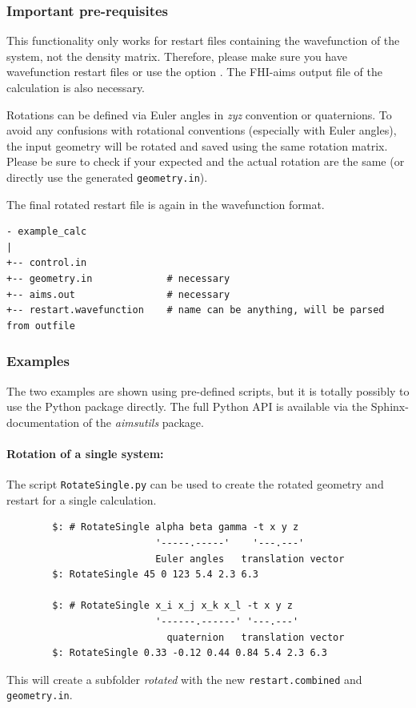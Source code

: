 \subsubsection*{Important pre-requisites}
This functionality only works for restart files containing the wavefunction of
the system, not the density matrix. Therefore, please make sure you have
wavefunction restart files or use the option
. The FHI-aims output file of the
calculation is also necessary.

Rotations can be defined via Euler angles in \emph{zyz} convention or quaternions. 
To avoid any confusions with rotational conventions (especially with Euler
angles), the input geometry will be rotated and saved using the same rotation
matrix. Please be sure to check if your expected and the actual rotation are the
same (or directly use the generated \texttt{geometry.in}). 

The final rotated restart file is again in the wavefunction format.

\begin{verbatim}
- example_calc
|
+-- control.in              
+-- geometry.in             # necessary 
+-- aims.out                # necessary 
+-- restart.wavefunction    # name can be anything, will be parsed from outfile
\end{verbatim}

\subsubsection*{Examples}
The two examples are shown using pre-defined scripts, but it is
totally possibly to use the Python package directly. The full Python API is
available via the Sphinx-documentation of the \emph{aimsutils} package.

\paragraph{Rotation of a single system:} The script \texttt{RotateSingle.py} can be
used to create the rotated geometry and restart for a single calculation.
\begin{verbatim}
        $: # RotateSingle alpha beta gamma -t x y z
                          '-----.-----'    '---.---'
                          Euler angles   translation vector
        $: RotateSingle 45 0 123 5.4 2.3 6.3

        $: # RotateSingle x_i x_j x_k x_l -t x y z
                          '------.------' '---.---'
                            quaternion   translation vector
        $: RotateSingle 0.33 -0.12 0.44 0.84 5.4 2.3 6.3
\end{verbatim}
This will create a subfolder \emph{rotated} with the new \texttt{restart.combined}
and \texttt{geometry.in}.

